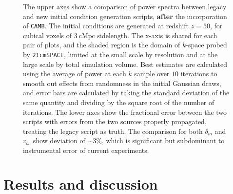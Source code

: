 \documentclass[floats,floatfix,showpacs,amssymb,prd,superscriptaddress,nofootinbib]{revtex4-2} %
\newcommand{\code}{\texttt}
\begin{document}
\begin{figure}[H]
        \caption{The upper axes show a comparison of power spectra between legacy and new initial condition generation scripts, \textbf{after} the incorporation of \code{CAMB}. The initial conditions are generated at redshift $z = 50$, for cubical voxels of $3 ~\text{cMpc}$ sidelength. The x-axis is shared for each pair of plots, and the shaded region is the domain of $k$-space probed by \code{21cmSPACE}, limited at the small scale by resolution and at the large scale by total simulation volume. Best estimates are calculated using the average of power at each $k$ sample over $10$ iterations to smooth out effects from randomness in the initial Gaussian draws, and error bars are calculated by taking the standard deviation of the same quantity and dividing by the square root of the number of iterations. The lower axes show the fractional error between the two scripts with errors from the two sources properly propagated, treating the legacy script as truth. The comparison for both $\delta_m$ and $v_{bc}$ show deviation of $\sim 3 \%$, which is significant but subdominant to instrumental error of current experiments.}
        \label{fig:compare_generators}
\end{figure}



\newpage
\section{Results and discussion}
\end{document}
